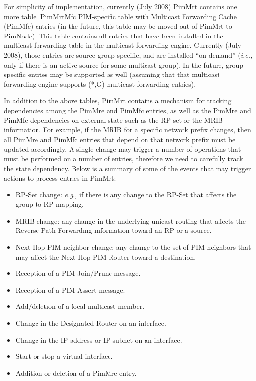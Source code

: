 \documentclass[11pt]{article}
\newcommand{\ie}{\emph{i.e.,}\xspace}
\newcommand{\eg}{\emph{e.g.,}\xspace}
\begin{document}
For simplicity of implementation, currently (July 2008) PimMrt
contains one more table: PimMrtMfc PIM-specific table with Multicast
Forwarding Cache (PimMfc) entries (in the future, this table may be
moved out of PimMrt to PimNode). This table contains all
entries that have been installed in the multicast forwarding table in
the multicast forwarding engine. Currently (July 2008), those
entries are source-group-specific, and are installed ``on-demand'' (\ie
only if there is an active source for some multicast group). In the future,
group-specific entries may be supported as well (assuming that that
multicast forwarding engine supports (*,G) multicast forwarding
entries).

In addition to the above tables, PimMrt contains a mechanism for
tracking dependencies among the PimMre and PimMfc entries, as well as
the PimMre and PimMfc dependencies on external state such as the RP set
or the MRIB information. For example, if the MRIB for a specific network
prefix changes, then all PimMre and PimMfc entries that depend on that
network prefix must be updated accordingly. A single change may trigger
a number of operations that must be performed on a number of entries,
therefore we need to carefully track the state dependency. Below is a
summary of some of the events that may trigger actions to process
entries in PimMrt:

\begin{itemize}

  \item RP-Set change: \eg if there is any change to the RP-Set that
  affects the group-to-RP mapping.

  \item MRIB change: any change in the underlying unicast routing that
  affects the Reverse-Path Forwarding information toward an RP or a
  source.

  \item Next-Hop PIM neighbor change: any change to the set of PIM
  neighbors that may affect the Next-Hop PIM Router toward a destination.

  \item Reception of a PIM Join/Prune message.

  \item Reception of a PIM Assert message.

  \item Add/deletion of a local multicast member.

  \item Change in the Designated Router on an interface.

  \item Change in the IP address or IP subnet on an interface.

  \item Start or stop a virtual interface.

  \item Addition or deletion of a PimMre entry.

\end{itemize}
\end{document}
